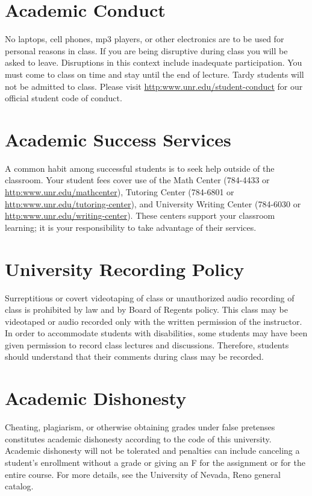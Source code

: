 \documentclass[11pt,onecolumn]{article}
\begin{document}
\section*{Academic Conduct}
No laptops, cell phones, mp3 players, or other electronics are to be used for personal reasons in class. If you are being disruptive during class you will be asked to leave. Disruptions in this context include inadequate participation. You must come to class on time and stay until the end of lecture. Tardy students will not be admitted to class. Please visit \url{http:www.unr.edu/student-conduct} for our official student code of conduct.

\section*{Academic Success Services}
A common habit among successful students is to seek help outside of the classroom. Your student fees cover use of the Math Center (784-4433 or \url{http:www.unr.edu/mathcenter}), Tutoring Center (784-6801 or \url{http:www.unr.edu/tutoring-center}), and University Writing Center (784-6030 or \url{http:www.unr.edu/writing-center}). These centers support your classroom learning; it is your responsibility to take advantage of their services.

\newpage
\section*{University Recording Policy}
Surreptitious or covert videotaping of class or unauthorized audio recording of class is prohibited by law and by Board of Regents policy. This class may be videotaped or audio recorded only with the written permission of the instructor. In order to accommodate students with disabilities, some students may have been given permission to record class lectures and discussions. Therefore, students should understand that their comments during class may be recorded.

\section*{Academic Dishonesty}
Cheating, plagiarism, or otherwise obtaining grades under false pretenses constitutes academic dishonesty according to the code of this university. Academic dishonesty will not be tolerated and penalties can include canceling a student’s enrollment without a grade or giving an F for the assignment or for the entire course. For more details, see the University of Nevada, Reno general catalog.
\end{document}
